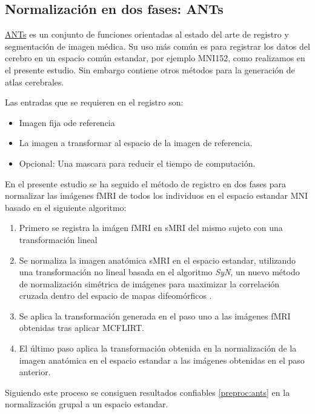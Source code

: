 \subsection{Normalización en dos fases: ANTs}

\hyperref[glos:ants]{ANTs} es un conjunto de funciones orientadas al estado del arte de registro y segmentación de imagen médica. Su uso más común es para registrar los datos del cerebro en un espacio común estandar, por ejemplo MNI152, como realizamos en el presente estudio. Sin embargo contiene otros métodos para la generación de atlas cerebrales.

Las entradas que se requieren en el registro son:

\begin{itemize}
	\item Imagen fija ode referencia
	\item La imagen a transformar al espacio de la imagen de referencia.
	\item Opcional: Una mascara para reducir el tiempo de computación.
\end{itemize}

En el presente estudio se ha seguido el método de registro en dos fases para normalizar las imágenes fMRI de todos los individuos en el espacio estandar MNI basado en el siguiente algoritmo:



\begin{enumerate}
\item Primero se registra la imágen fMRI en sMRI del mismo sujeto con una transformación lineal
\item Se normaliza la imagen anatómica sMRI en el espacio estandar, utilizando una transformación no lineal basada en el algoritmo \textit{SyN}, un nuevo método de normalización simétrica de imágenes para maximizar la correlación cruzada dentro del espacio de mapas difeomórficos \cite{syn}.
\item Se aplica la transformación generada en el paso uno a las imágenes fMRI obtenidas tras aplicar MCFLIRT. 
\item El último paso aplica la transformación obtenida en la normalización de la imagen anatómica en el espacio estandar a las imágenes obtenidas en el paso anterior. 
\end{enumerate}

Siguiendo este proceso se consiguen resultados confiables \ref{preproc:ants} en la normalización grupal a un espacio estandar.

